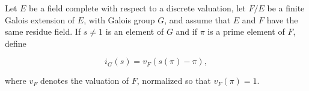 Let $E$ be a field complete with respect to a discrete valuation, let $F/E$ be a finite Galois extension of $E$, with Galois group $G$, and assume that $E$ and $F$ have the same residue field. If $s \neq 1$ is an element of $G$ and if $\pi$ is a prime element of $F$, define

$$i_G(s) = v_F(s(\pi) - \pi),$$

where $v_F$ denotes the valuation of $F$, normalized so that $v_F(\pi) = 1$.

